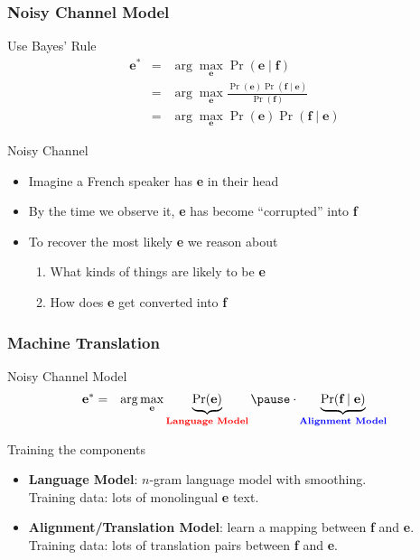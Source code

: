 \begin{frame}
\frametitle{Noisy Channel Model}
\begin{block}{Use Bayes' Rule}
\begin{eqnarray*}
\textbf{e}^\ast & = & \arg\max_{\textbf{e}} \Pr(\textbf{e} \mid \textbf{f}) \\
& = & \arg\max_{\textbf{e}} \frac{ \Pr(\textbf{e}) \Pr(\textbf{f} \mid \textbf{e}) }{ \Pr(\textbf{f}) } \\
& = & \arg\max_{\textbf{e}} \Pr(\textbf{e}) \Pr(\textbf{f} \mid \textbf{e})
\end{eqnarray*}
\end{block}\pause
\begin{block}{Noisy Channel}
\begin{itemize}
\item Imagine a French speaker has \textbf{e} in their head
\item By the time we observe it, \textbf{e} has become ``corrupted'' into \textbf{f}
\item To recover the most likely \textbf{e} we reason about 
\begin{enumerate}
\item What kinds of things are likely to be \textbf{e}
\item How does \textbf{e} get converted into \textbf{f}
\end{enumerate}
\end{itemize}
\end{block}
\end{frame}

\begin{frame}
\frametitle{Machine Translation}
\begin{block}{Noisy Channel Model}
\begin{eqnarray*}
\textbf{e}^\ast & = & \arg\max_{\textbf{e}} \underbrace{\Pr(\textbf{e})}_{\color{red}\textbf{Language Model}} \pause \cdot \underbrace{\Pr(\textbf{f} \mid \textbf{e})}_{\color{blue}\textbf{Alignment Model}}
\end{eqnarray*}
\end{block}\pause
\begin{block}{Training the components}
\begin{itemize}[<+->]
\item \color{red}\textbf{Language Model}: $n$-gram language model with smoothing. \\
Training data: lots of monolingual \textbf{e} text.
\item \color{blue}\textbf{Alignment/Translation Model}: learn a mapping between \textbf{f} and \textbf{e}. \\
Training data: lots of translation pairs between \textbf{f} and \textbf{e}.
\end{itemize}
\end{block}
\end{frame}

